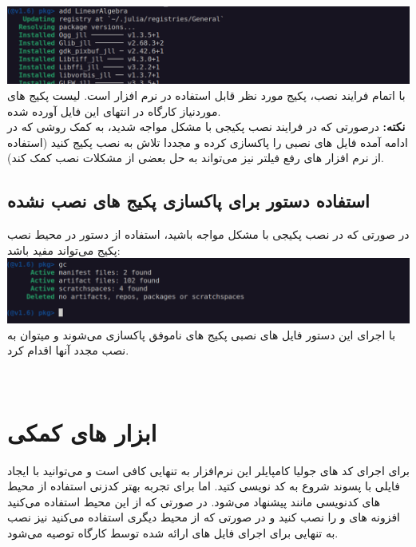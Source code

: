 \documentclass[a4paper]{article}
\begin{document}
	\includegraphics[width = \textwidth]{../img/img-5} \\

	با اتمام فرایند نصب، پکیج مورد نظر قابل استفاده در نرم افزار است.
	لیست پکیج های موردنیاز کارگاه در انتهای این فایل آورده شده.
\\
\textbf{نکته:} درصورتی که در فرایند نصب پکیجی با مشکل مواجه شدید، به کمک روشی که در ادامه آمده فایل های نصبی را پاکسازی کرده و مجددا تلاش به نصب پکیج کنید (استفاده از نرم افزار های رفع فیلتر نیز می‌تواند به حل بعضی از مشکلات نصب کمک کند).

	\subsection{استفاده دستور  برای پاکسازی پکیج های نصب نشده}

	در صورتی که در نصب پکیجی با مشکل مواجه باشید، استفاده از دستور  در محیط نصب پکیج می‌تواند مفید باشد:\\

	\includegraphics[width = \textwidth]{../img/img-6} \\

	با اجرای این دستور فایل های نصبی پکیج های ناموفق پاکسازی می‌شوند و میتوان به نصب مجدد آنها اقدام کرد.

	‌\section{ابزار های کمکی}

	 برای اجرای کد های جولیا کامپایلر این نرم‌افزار به تنهایی کافی است و می‌توانید با ایجاد فایلی با پسوند 
	 شروع به کد نویسی کتید. اما برای تجربه بهتر کدزنی استفاده از محیط های کدنویسی مانند 
	 پیشنهاد می‌شود. در صورتی که از این محیط استفاده می‌کنید افزونه های 
	 و 
	 را نصب کنید و در صورتی که از محیط دیگری استفاده می‌کنید نیز نصب  به تنهایی برای اجرای فایل های ارائه شده توسط کارگاه توصیه می‌شود. \\
\end{document}
